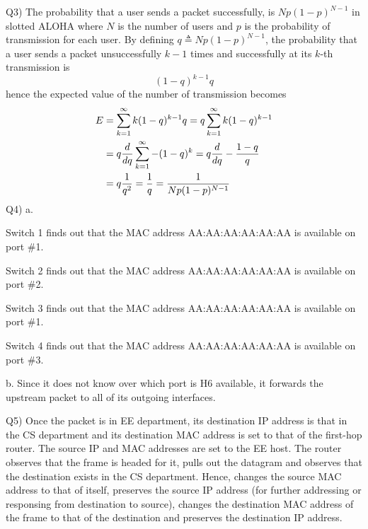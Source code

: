 \documentclass[10pt,letterpaper]{article}
\begin{document}
Q3) 
The probability that a user sends a packet successfully, is $Np(1-p)^{N-1}$ in slotted ALOHA where $N$ is the number of users and $p$ is the probability of transmission for each user. By defining $q\triangleq Np(1-p)^{N-1}$, the probability that a user sends a packet unsuccessfully $k-1$ times and successfully at its $k$-th transmission is 
$$(1-q)^{k-1}q$$
hence the expected value of the number of transmission becomes 
\begin{equation}
\begin{split}
E&=\sum_{k=1}^{\infty}k(1-q)^{k-1}q
=q\sum_{k=1}^{\infty}k(1-q)^{k-1}
\\&=q{d\over dq}\sum_{k=1}^{\infty}-(1-q)^{k}
=q{d\over dq} -{1-q\over q}
\\&=q{1\over q^2}={1\over q}
={1\over Np(1-p)^{N-1}}
\end{split}
\end{equation}
Q4)
a.

Switch 1 finds out that the MAC address AA:AA:AA:AA:AA:AA is available on port \#1.

Switch 2 finds out that the MAC address AA:AA:AA:AA:AA:AA is available on port \#2.

Switch 3 finds out that the MAC address AA:AA:AA:AA:AA:AA is available on port \#1.

Switch 4 finds out that the MAC address AA:AA:AA:AA:AA:AA is available on port \#3.

b. Since it does not know over which port is H6 available, it forwards the upstream packet to all of its outgoing interfaces.

Q5) Once the packet is in EE department, its destination IP address is that in the CS department and its destination MAC address is set to that of the first-hop router. The source IP and MAC addresses are set to the EE host. The router observes that the frame is headed for it, pulls out the datagram and observes that the destination exists in the CS department. Hence, changes the source MAC address to that of itself, preserves the source IP address (for further addressing or responsing from destination to source), changes the destination MAC address of the frame to that of the destination and preserves the destination IP address.
\end{document}

